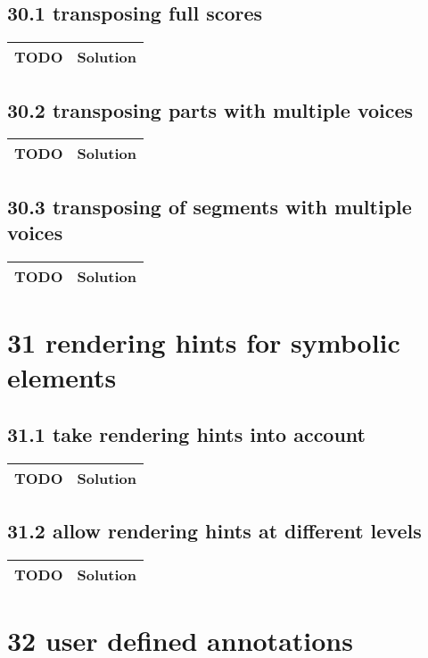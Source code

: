  \subsection*{30.1 transposing full scores}
 \begin{tabular}{|p{}|p{}|}
 \hline
 \textbf{TODO} &
 \textbf{Solution} 
\\
 \hline
 \end{tabular} \subsection*{30.2 transposing parts with multiple voices}
 \begin{tabular}{|p{}|p{}|}
 \hline
 \textbf{TODO} &
 \textbf{Solution} 
\\
 \hline
 \end{tabular} \subsection*{30.3 transposing of segments with multiple voices}
 \begin{tabular}{|p{}|p{}|}
 \hline
 \textbf{TODO} &
 \textbf{Solution} 
\\
 \hline
 \end{tabular} \section*{31 rendering hints for symbolic elements}
 \subsection*{31.1 take rendering hints into account}
 \begin{tabular}{|p{}|p{}|}
 \hline
 \textbf{TODO} &
 \textbf{Solution} 
\\
 \hline
 \end{tabular} \subsection*{31.2 allow rendering hints at different levels}
 \begin{tabular}{|p{}|p{}|}
 \hline
 \textbf{TODO} &
 \textbf{Solution} 
\\
 \hline
 \end{tabular} \section*{32 user defined annotations}
